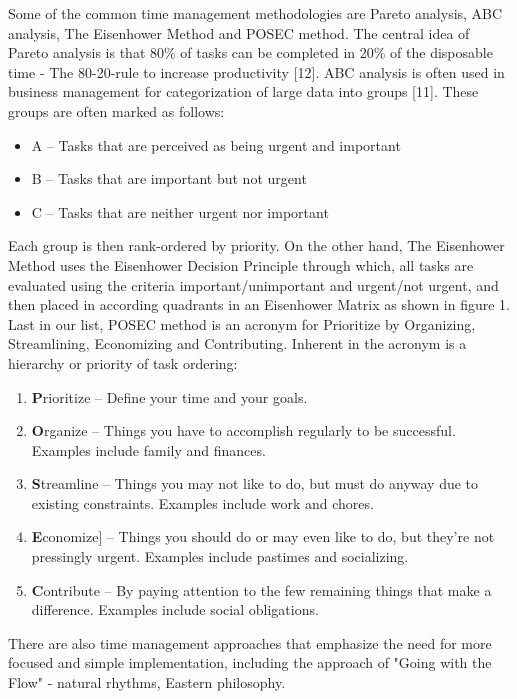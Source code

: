 \documentclass[conference]{IEEEtran}
\begin{document}
Some of the common time management methodologies are Pareto analysis, ABC analysis, The Eisenhower Method and POSEC method. The central idea of Pareto analysis is that 80\% of tasks can be completed in 20\% of the disposable time - The 80-20-rule to increase productivity [12]. ABC analysis is often used in business management for categorization of large data into groups [11]. These groups are often marked as follows:
\begin{itemize}
  \item A -- Tasks that are perceived as being urgent and important
  \item B -- Tasks that are important but not urgent
  \item C -- Tasks that are neither urgent nor important
\end{itemize}
Each group is then rank-ordered by priority. On the other hand, The Eisenhower Method uses the Eisenhower Decision Principle through which, all tasks are evaluated using the criteria important/unimportant and urgent/not urgent, and then placed in according quadrants in an Eisenhower Matrix as shown in figure 1. Last in our list, POSEC method is an acronym for Prioritize by Organizing, Streamlining, Economizing and Contributing. Inherent in the acronym is a hierarchy or priority of task ordering:
\begin{enumerate}
  \item \textbf{P}rioritize -- Define your time and your goals.
  \item \textbf{O}rganize -- Things you have to accomplish regularly to be successful. Examples include family and finances.
  \item \textbf{S}treamline -- Things you may not like to do, but must do anyway due to existing constraints. Examples include work and chores.
  \item \textbf{E}conomize] -- Things you should do or may even like to do, but they're not pressingly urgent. Examples include pastimes and socializing.
  \item \textbf{C}ontribute -- By paying attention to the few remaining things that make a difference. Examples include social obligations.
\end{enumerate}
There are also time management approaches that emphasize the need for more focused and simple implementation, including the approach of "Going with the Flow" - natural rhythms, Eastern philosophy.
\end{document}
